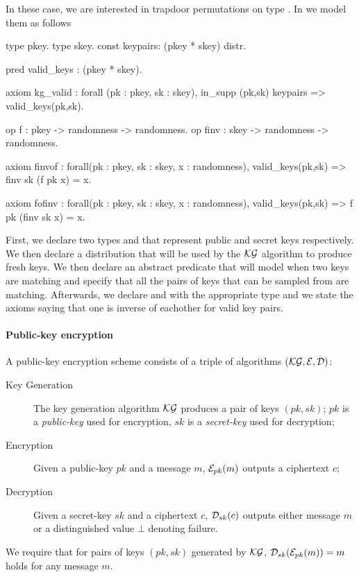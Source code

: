 In these case, we are interested in trapdoor permutations on type
. In \EC we model them as follows
\begin{easycrypt}[label={lst:owf}]{}
type pkey.
type skey.
const keypairs: (pkey * skey) distr.

pred valid_keys : (pkey * skey).

axiom kg_valid : forall (pk : pkey, sk : skey), 
in_supp (pk,sk) keypairs => valid_keys(pk,sk).

op f : pkey -> randomness -> randomness.
op finv : skey -> randomness -> randomness.


axiom finvof : forall(pk : pkey, sk : skey, x : randomness),
 valid_keys(pk,sk) => finv sk (f pk x) = x.

axiom fofinv : forall(pk : pkey, sk : skey, x : randomness),
 valid_keys(pk,sk) => f pk (finv sk x) = x.
\end{easycrypt}
First, we declare two types  and  that represent
public and secret keys respectively. We then declare a distribution
 that will be used by the $\mathcal{KG}$ algorithm to produce fresh
keys. We then declare an abstract predicate that will model when two
keys are matching and specify that all the pairs of keys that can be
sampled from  are matching. Afterwards, we declare 
and  with the appropriate type and we state the axioms saying
that one is inverse of eachother for valid key pairs.
 
\paragraph{Public-key encryption}
A public-key encryption scheme consists of a triple of algorithms
$(\mathcal{KG},\mathcal{E},\mathcal{D})$:

\begin{description}
\item[Key Generation] 
  The key generation algorithm $\mathcal{KG}$ produces a pair of keys $(pk,sk)$;
  $pk$ is a \emph{public-key} used for encryption, $sk$ is
  a \emph{secret-key} used for decryption;

\item[Encryption] 
  Given a public-key $pk$ and a message $m$, $\mathcal{E}_{pk}(m)$ outputs a
  ciphertext $c$;

\item[Decryption] 
  Given a secret-key $sk$ and a ciphertext $c$, $\mathcal{D}_{sk}(c)$ outputs
  either message $m$ or a distinguished value $\bot$ denoting failure.
\end{description}
%
We require that for pairs of keys $(pk,sk)$ generated by $\mathcal{KG}$,
$\mathcal{D}_{sk}(\mathcal{E}_{pk}(m))= m$ holds for any message $m$. 

